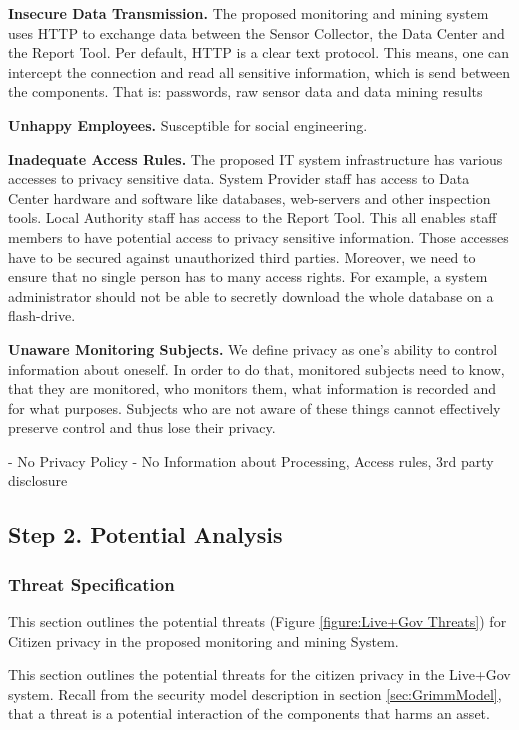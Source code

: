\textbf{Insecure Data Transmission.}
The proposed monitoring and mining system uses HTTP to exchange data between the Sensor Collector, the Data Center and the Report Tool.
Per default, HTTP is a clear text protocol.
This means, one can intercept the connection and read all sensitive information, which is send between the components.
That is: passwords, raw sensor data and data mining results

\textbf{Unhappy Employees.} Susceptible for social engineering.

\textbf{Inadequate Access Rules.}
The proposed IT system infrastructure has various accesses to privacy sensitive data.
System Provider staff has access to Data Center hardware and software like databases, web-servers and other inspection tools.
Local Authority staff has access to the Report Tool.
This all enables staff members to have potential access to privacy sensitive information.
Those accesses have to be secured against unauthorized third parties.
Moreover, we need to ensure that no single person has to many access rights.
For example, a system administrator should not be able to secretly download the whole database on a flash-drive.

\textbf{Unaware Monitoring Subjects.}
We define privacy as one's ability to control information about oneself.
In order to do that, monitored subjects need to know, that they are monitored, who monitors them, what information is recorded and for what purposes.
Subjects who are not aware of these things cannot effectively preserve control and thus lose their privacy.

- No Privacy Policy
- No Information about Processing, Access rules, 3rd party disclosure

\subsection{Step 2. Potential Analysis}


\subsubsection{Threat Specification}

This section outlines the potential threats (Figure \ref{figure:Live+Gov Threats}) for Citizen privacy in the proposed monitoring and mining System.



This section outlines the potential threats for the citizen privacy in the Live+Gov system.
Recall from the security model description in section \ref{sec:GrimmModel}, that a threat is
a potential interaction of the components that harms an asset.

